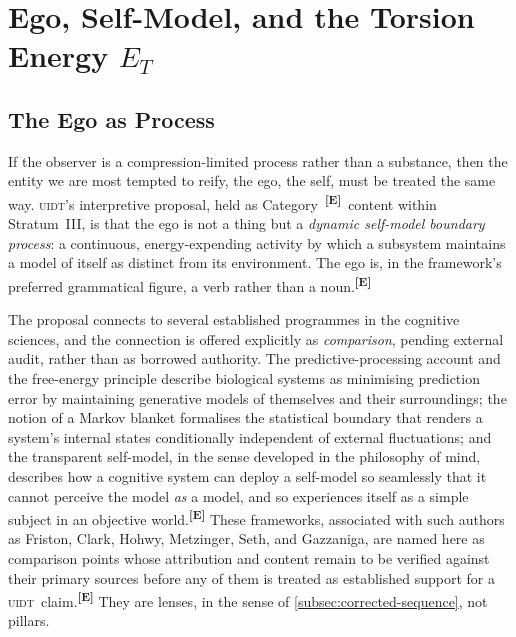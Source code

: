 \documentclass[12pt,a4paper,twoside]{article}
\theoremstyle{plain}
\theoremstyle{definition}
\theoremstyle{remark}
\newcommand{\UIDT}{\textsc{uidt}}
\newcommand{\catmark}[1]{\textsuperscript{\textsf{\textbf{[#1]}}}}
\begin{document}
\section{Ego, Self-Model, and the Torsion Energy \texorpdfstring{$E_T$}{E_T}}
\label{sec:ego-selfmodel-et}

\subsection{The Ego as Process}
\label{subsec:ego-as-process}

If the observer is a compression-limited process rather than a substance, then the entity we are most tempted to reify, the ego, the self, must be treated the same way. \UIDT's interpretive proposal, held as Category~\catmark{E}\ content within Stratum~III, is that the ego is not a thing but a \emph{dynamic self-model boundary process}: a continuous, energy-expending activity by which a subsystem maintains a model of itself as distinct from its environment. The ego is, in the framework's preferred grammatical figure, a verb rather than a noun.\catmark{E}

The proposal connects to several established programmes in the cognitive sciences, and the connection is offered explicitly as \emph{comparison}, pending external audit, rather than as borrowed authority. The predictive-processing account and the free-energy principle describe biological systems as minimising prediction error by maintaining generative models of themselves and their surroundings; the notion of a Markov blanket formalises the statistical boundary that renders a system's internal states conditionally independent of external fluctuations; and the transparent self-model, in the sense developed in the philosophy of mind, describes how a cognitive system can deploy a self-model so seamlessly that it cannot perceive the model \emph{as} a model, and so experiences itself as a simple subject in an objective world.\catmark{E} These frameworks, associated with such authors as Friston, Clark, Hohwy, Metzinger, Seth, and Gazzaniga, are named here as comparison points whose attribution and content remain to be verified against their primary sources before any of them is treated as established support for a \UIDT\ claim.\catmark{E} They are lenses, in the sense of \cref{subsec:corrected-sequence}, not pillars.
\end{document}
